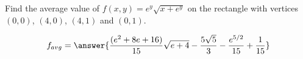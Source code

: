 \documentclass{ximera}
\author{David Guichard \and Neal Koblitz \and H. Jerome Keisler \and Albert Scheller \and Barry Balof \and Mike Wills \and Matthew Carr}
\begin{document}
\begin{exercise}




Find the average value of $f(x,y)=e^{y}\sqrt{x+e^y}$ on the rectangle with vertices $(0,0)$, $(4,0)$, $(4,1)$ and $(0,1)$.
\begin{prompt}
\[
f_{avg}=\answer{\frac{(e^2+8e+16)}{15}\sqrt{e+4}-\frac{5\sqrt{5}}{3}-\frac{e^{5/2}}{15}+\frac{1}{15}}
\]
\end{prompt}



\end{exercise}
\end{document}
